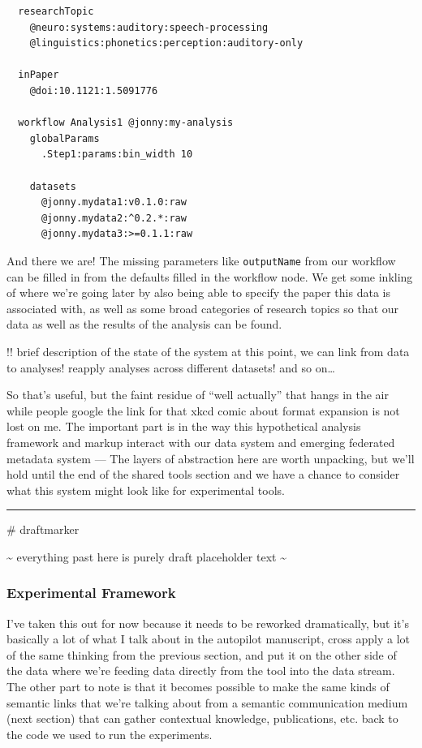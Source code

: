 \documentclass[10pt]{article}
\begin{document}
\begin{multicols}{2}
\begin{verbatim}
  researchTopic
    @neuro:systems:auditory:speech-processing
    @linguistics:phonetics:perception:auditory-only

  inPaper
    @doi:10.1121:1.5091776 

  workflow Analysis1 @jonny:my-analysis
    globalParams
      .Step1:params:bin_width 10

    datasets
      @jonny.mydata1:v0.1.0:raw
      @jonny.mydata2:^0.2.*:raw
      @jonny.mydata3:>=0.1.1:raw
\end{verbatim}

And there we are! The missing parameters like \texttt{outputName} from
our workflow can be filled in from the defaults filled in the workflow
node. We get some inkling of where we're going later by also being able
to specify the paper this data is associated with, as well as some broad
categories of research topics so that our data as well as the results of
the analysis can be found.

!! brief description of the state of the system at this point, we can
link from data to analyses! reapply analyses across different datasets!
and so on\ldots{}

So that's useful, but the faint residue of ``well actually'' that hangs
in the air while people google the link for that xkcd comic about format
expansion is not lost on me. The important part is in the way this
hypothetical analysis framework and markup interact with our data system
and emerging federated metadata system --- The layers of abstraction
here are worth unpacking, but we'll hold until the end of the shared
tools section and we have a chance to consider what this system might
look like for experimental tools.

\begin{center}\rule{0.5\linewidth}{0.5pt}\end{center}

\hypertarget{draftmarker}{}
\# draftmarker

\textasciitilde{} everything past here is purely draft placeholder text
\textasciitilde{}


\end{multicols}


\hypertarget{experimental-framework}{%
\subsubsection{Experimental Framework}\label{experimental-framework}}

I've taken this out for now because it needs to be reworked
dramatically, but it's basically a lot of what I talk about in the
autopilot manuscript, cross apply a lot of the same thinking from the
previous section, and put it on the other side of the data where we're
feeding data directly from the tool into the data stream. The other part
to note is that it becomes possible to make the same kinds of semantic
links that we're talking about from a semantic communication medium
(next section) that can gather contextual knowledge, publications, etc.
back to the code we used to run the experiments.
\end{document}
